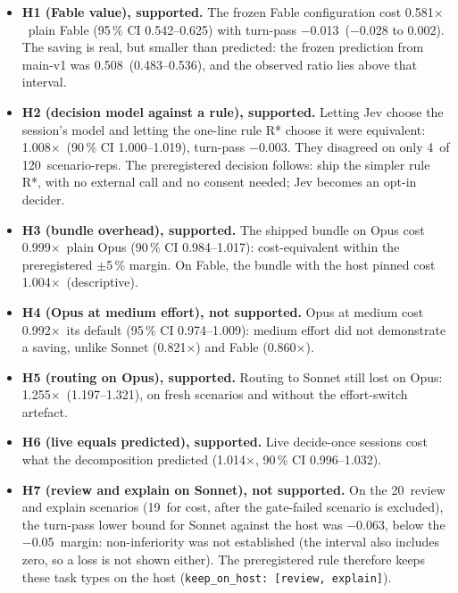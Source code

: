 \documentclass[11pt,letterpaper]{article}
\newcommand{\code}[1]{\texttt{#1}}
\newcommand{\X}{\ensuremath{\times}}
\newcommand{\EcRatio}{0.821}
\newcommand{\EfRatio}{0.860}
\newcommand{\NIMargin}{$-$0.05}
\newcommand{\SHFiveCI}{1.197--1.321}
\newcommand{\SHFiveRatio}{1.255}
\newcommand{\SHFiveVerdict}{supported}
\newcommand{\SHFourCI}{0.974--1.009}
\newcommand{\SHFourRatio}{0.992}
\newcommand{\SHFourVerdict}{not supported}
\newcommand{\SHOneCI}{0.542--0.625}
\newcommand{\SHOneDtp}{$-$0.013}
\newcommand{\SHOneDtpCI}{$-$0.028 to 0.002}
\newcommand{\SHOneRatio}{0.581}
\newcommand{\SHOneVerdict}{supported}
\newcommand{\SHSevenDtpLow}{$-$0.063}
\newcommand{\SHSevenN}{19}
\newcommand{\SHSevenQualN}{20}
\newcommand{\SHSevenVerdict}{not supported}
\newcommand{\SHSixCINinety}{0.996--1.032}
\newcommand{\SHSixRatio}{1.014}
\newcommand{\SHSixVerdict}{supported}
\newcommand{\SHThreeBRatio}{1.004}
\newcommand{\SHThreeCINinety}{0.984--1.017}
\newcommand{\SHThreeRatio}{0.999}
\newcommand{\SHThreeVerdict}{supported}
\newcommand{\SHTwoCINinety}{1.000--1.019}
\newcommand{\SHTwoDisc}{4}
\newcommand{\SHTwoDtp}{$-$0.003}
\newcommand{\SHTwoRatio}{1.008}
\newcommand{\SHTwoReps}{120}
\newcommand{\SHTwoVerdict}{supported}
\newcommand{\SPredCI}{0.483--0.536}
\newcommand{\SPredRatio}{0.508}
\begin{document}
\begin{itemize}
  \item \textbf{H1 (Fable value), \SHOneVerdict.} The frozen Fable configuration cost \SHOneRatio\X\ plain Fable (95\,\% CI
    \SHOneCI) with turn-pass \SHOneDtp\ (\SHOneDtpCI). The saving is real, but smaller than predicted: the frozen
    prediction from main-v1 was \SPredRatio\ (\SPredCI), and the observed ratio lies above that interval.
  \item \textbf{H2 (decision model against a rule), \SHTwoVerdict.} Letting Jev choose the session's model and letting
    the one-line rule R* choose it were equivalent: \SHTwoRatio\X\ (90\,\% CI \SHTwoCINinety), turn-pass \SHTwoDtp. They
    disagreed on only \SHTwoDisc\ of \SHTwoReps\ scenario-reps. The preregistered decision follows: ship the simpler rule
    R*, with no external call and no consent needed; Jev becomes an opt-in decider.
  \item \textbf{H3 (bundle overhead), \SHThreeVerdict.} The shipped bundle on Opus cost \SHThreeRatio\X\ plain Opus (90\,\%
    CI \SHThreeCINinety): cost-equivalent within the preregistered $\pm$5\,\% margin. On Fable, the bundle with the host pinned cost \SHThreeBRatio\X\ (descriptive).
  \item \textbf{H4 (Opus at medium effort), \SHFourVerdict.} Opus at medium cost \SHFourRatio\X\ its default (95\,\% CI
    \SHFourCI): medium effort did not demonstrate a saving, unlike Sonnet (\EcRatio\X) and Fable (\EfRatio\X).
  \item \textbf{H5 (routing on Opus), \SHFiveVerdict.} Routing to Sonnet still lost on Opus: \SHFiveRatio\X\ (\SHFiveCI),
    on fresh scenarios and without the effort-switch artefact.
  \item \textbf{H6 (live equals predicted), \SHSixVerdict.} Live decide-once sessions cost what the decomposition predicted
    (\SHSixRatio\X, 90\,\% CI \SHSixCINinety).
  \item \textbf{H7 (review and explain on Sonnet), \SHSevenVerdict.} On the \SHSevenQualN\ review and explain scenarios
    (\SHSevenN\ for cost, after the gate-failed scenario is excluded), the turn-pass lower bound for Sonnet against the host was \SHSevenDtpLow, below the \NIMargin\ margin: non-inferiority was not
    established (the interval also includes zero, so a loss is not shown either). The preregistered
    rule therefore keeps these task types on the host (\code{keep\_on\_host: [review, explain]}).
\end{itemize}
\end{document}
